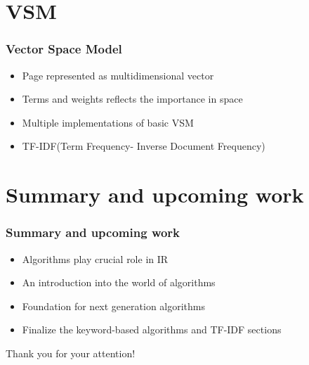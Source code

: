 \documentclass{beamer}
\begin{document}
\section{VSM}
\begin{frame}[fragile=singleslide]\frametitle{Vector Space Model}
\begin{itemize}
    \item Page represented as multidimensional vector
    \item Terms and weights reflects the importance in space
    \item Multiple implementations of basic VSM
    \item TF-IDF(Term Frequency- Inverse Document Frequency)
\end{itemize}
\end{frame}



\section*{Summary and upcoming work }

\begin{frame}[fragile=singleslide]\frametitle{Summary and upcoming work}
\begin{itemize}
    \item Algorithms play crucial role in IR 
    \item An introduction into the world of algorithms
    \item Foundation for next generation algorithms
    \item Finalize the keyword-based algorithms and TF-IDF sections 
\end{itemize}
\end{frame}
\begin{frame}{}
    \centering Thank you for your attention!
\end{frame}
\end{document}
